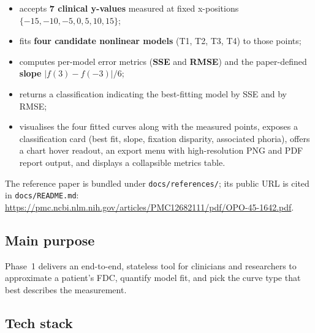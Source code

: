 \documentclass[11pt,a4paper]{article}
\begin{document}
\begin{itemize}[leftmargin=1.2em]
  \item accepts \textbf{7 clinical y-values} measured at fixed x-positions
        $\{-15,-10,-5,0,5,10,15\}$;
  \item fits \textbf{four candidate nonlinear models} (T1, T2, T3, T4) to those points;
  \item computes per-model error metrics (\textbf{SSE} and \textbf{RMSE}) and
        the paper-defined \textbf{slope} $|f(3)-f(-3)|/6$;
  \item returns a classification indicating the best-fitting model by SSE and by RMSE;
  \item visualises the four fitted curves along with the measured points,
        exposes a classification card (best fit, slope, fixation disparity,
        associated phoria), offers a chart hover readout, an export menu with
        high-resolution PNG and PDF report output, and displays a collapsible
        metrics table.
\end{itemize}

The reference paper is bundled under \texttt{docs/references/}; its public URL
is cited in \texttt{docs/README.md}:
\url{https://pmc.ncbi.nlm.nih.gov/articles/PMC12682111/pdf/OPO-45-1642.pdf}.

\subsection{Main purpose}
Phase~1 delivers an end-to-end, stateless tool for clinicians and researchers
to approximate a patient's FDC, quantify model fit, and pick the curve type
that best describes the measurement.

\subsection{Tech stack}
\end{document}
